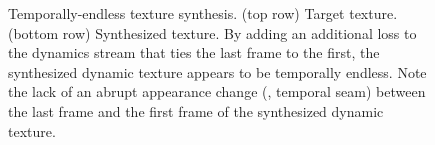 \begin{figure}[t]
	\centering
	\caption[Temporally-endless texture synthesis.]{Temporally-endless texture synthesis. (top row) Target texture. (bottom row) Synthesized texture.
	 By adding an additional loss to the dynamics stream that ties the last frame to the first, the synthesized dynamic texture appears to be temporally endless. Note the lack of an abrupt appearance change (\ie, temporal seam) between the last frame and the first frame of the synthesized dynamic texture.}
	\label{fig:temporally_endless_synthesis}
\end{figure}

